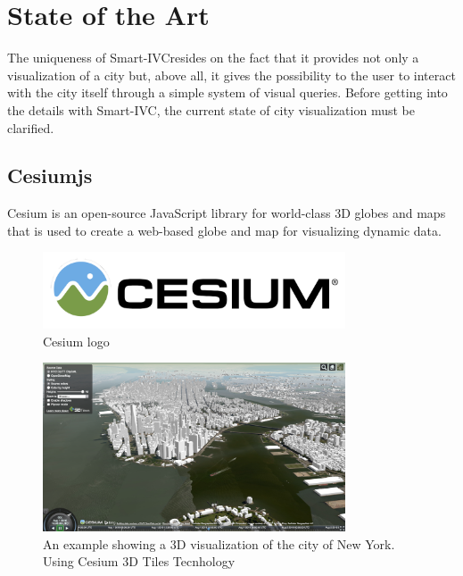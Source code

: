 \documentclass[]{usiinfbachelorproject}
\newcommand{\applicationName}{Smart-IVC}
\begin{document}
\section{State of the Art} \label{stateOfTheArt}
The uniqueness of \applicationName resides on the fact that it provides not only a visualization of a city but, above all, it gives the possibility to the user to interact with the city itself through a simple system of visual queries.
Before getting into the details with \applicationName, the current state of city visualization must be clarified.

\subsection{Cesiumjs}
Cesium is an open-source JavaScript library for world-class 3D globes and maps that is used to create a web-based globe and map for visualizing dynamic data. 
\begin{figure} [H]
\centering
\includegraphics[width=0.8\textwidth]{images/cesium_logo}
\caption{Cesium logo}
\label{fig:cesium_logo}
\end{figure}
\begin{figure} [H]
\centering
\includegraphics[width=0.8\textwidth]{images/NewYorkCityCesium3dTiles}
\caption{An example showing a 3D visualization of the city of New York. Using Cesium 3D Tiles Tecnhology}
\label{fig:NewYorkCityCesium3dTiles}
\end{figure}
\end{document}
